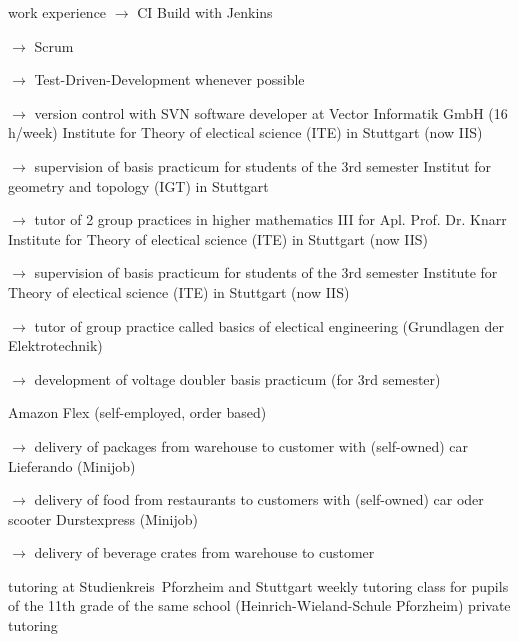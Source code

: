 \begin{rubric}{\textcolor{black!20!blue!100}{work experience}}
			$\rightarrow$ CI Build with Jenkins
			
			$\rightarrow$ Scrum
			
			$\rightarrow$ Test-Driven-Development whenever possible
			
			$\rightarrow$ version control with SVN
		\entry*[05/2016 --- 10/2017]
			software developer at Vector Informatik GmbH (16\,h/week)
		\entry*[10/2015 --- 03/2016]
			Institute for Theory of electical science (ITE) in Stuttgart (now IIS)
				
			\setlength{\hangindent}{\widthof{$\rightarrow$ }}
			$\rightarrow$ supervision of basis practicum for students of the 3rd semester
		\entry*
			Institut for geometry and topology (IGT) in Stuttgart
			
			\setlength{\hangindent}{\widthof{$\rightarrow$ }}
			$\rightarrow$ tutor of 2 group practices in higher mathematics III for Apl. Prof. Dr. Knarr
		\entry*[10/2014 --- 03/2015]
			Institute for Theory of electical science (ITE) in Stuttgart (now IIS)
			
			\setlength{\hangindent}{\widthof{$\rightarrow$ }}
			$\rightarrow$ supervision of basis practicum for students of the 3rd semester
		\entry*[10/2013 --- 03/2014]
			Institute for Theory of electical science (ITE) in Stuttgart (now IIS)
			
			\setlength{\hangindent}{\widthof{$\rightarrow$ }}
			$\rightarrow$ tutor of group practice called basics of electical engineering (\glqq Grundlagen der Elektrotechnik\grqq)
			
			$\rightarrow$ development of voltage doubler basis practicum (for 3rd semester)
	
		\entry*[since 09/11/2020]
			Amazon Flex (self-employed, order based)
			
			\setlength{\hangindent}{\widthof{$\rightarrow$ }}
			$\rightarrow$ delivery of packages from warehouse to customer with (self-owned) car
		\entry*[24/10/2020 --- 04/01/2021]
			Lieferando (Minijob)
			
			\setlength{\hangindent}{\widthof{$\rightarrow$ }}
			$\rightarrow$ delivery of food from restaurants to customers with (self-owned) car oder scooter
		\entry*[17/07/2020 --- 18/10/2020]
			Durstexpress (Minijob)
			
			\setlength{\hangindent}{\widthof{$\rightarrow$ }}
			$\rightarrow$ delivery of beverage crates from warehouse to customer
				
		\entry*[10/2015 --- 01/2016]
			tutoring at \glqq Studienkreis\grqq\ Pforzheim and Stuttgart
		\entry*[10/2011 --- 06/2012]
			weekly tutoring class for pupils of the 11th grade of the same school (Heinrich-Wieland-Schule Pforzheim)
		\entry*[\phantom{10/}2010 --- 2016]
			private tutoring
			

\end{rubric}
